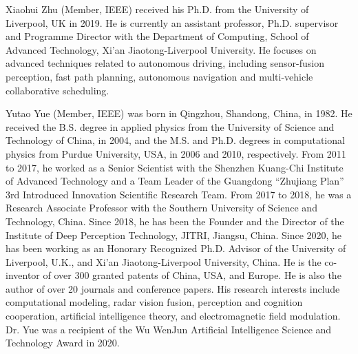 \documentclass[lettersize,journal]{IEEEtran}
\begin{document}
\begin{IEEEbiography}
{Xiaohui Zhu}
(Member, IEEE) received his Ph.D. from the University of Liverpool, UK in 2019. He is currently an assistant professor, Ph.D. supervisor and Programme Director with the Department of Computing, School of Advanced Technology, Xi'an Jiaotong-Liverpool University. He focuses on advanced techniques related to autonomous driving, including sensor-fusion perception, fast path planning, autonomous navigation and multi-vehicle collaborative scheduling. 
\end{IEEEbiography}
\vspace{-1cm}
\begin{IEEEbiography}{Yutao Yue}
(Member, IEEE) was born in Qingzhou, Shandong, China, in 1982. He received the B.S. degree in applied physics from the University of Science and Technology of China, in 2004, and the M.S. and Ph.D. degrees in computational physics from Purdue University, USA, in 2006 and 2010, respectively. From 2011 to 2017, he worked as a Senior Scientist with the Shenzhen Kuang-Chi Institute of Advanced Technology and a Team Leader of the Guangdong ``Zhujiang Plan'' 3rd Introduced Innovation Scientific Research Team. From 2017 to 2018, he was a Research Associate Professor with the Southern University of Science and Technology, China. Since 2018, he has been the Founder and the Director of the Institute of Deep Perception Technology, JITRI, Jiangsu, China. Since 2020, he has been working as an Honorary Recognized Ph.D. Advisor of the University of Liverpool, U.K., and Xi'an Jiaotong-Liverpool University, China. He is the co-inventor of over 300 granted patents of China, USA, and Europe. He is also the author of over 20 journals and conference papers. His research interests include computational modeling, radar vision fusion, perception and cognition cooperation, artificial intelligence theory, and electromagnetic field modulation. Dr. Yue was a recipient of the Wu WenJun Artificial Intelligence Science and Technology Award in 2020.
\end{IEEEbiography}
\end{document}
